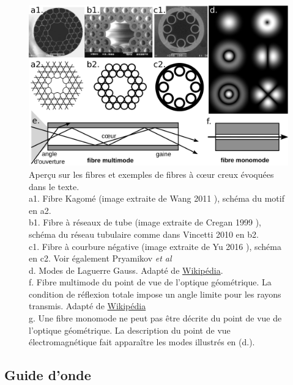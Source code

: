 \begin{figure}
    \centering
    \includegraphics[width=\textwidth]{./files/fibers.svg.png}
    \caption{Aperçu sur les fibres et exemples de fibres à cœur creux évoquées dans le texte.
    \\ a1. Fibre Kagomé (image extraite de Wang 2011 \cite{wang_low_2011}), schéma du motif en a2.
    \\ b1. Fibre à réseaux de tube (image extraite de Cregan 1999 \cite{cregan_single-mode_1999}), schéma du réseau tubulaire comme dans Vincetti 2010 \cite{vincetti_waveguiding_2010} en b2.
    \\ c1. Fibre à courbure négative (image extraite de Yu 2016 \cite{yu_negative_2016}), schéma en c2. Voir également Pryamikov \emph{et al} \cite{pryamikov_demonstration_2011}
    \\ d. Modes de Laguerre Gauss. Adapté de \href{https://en.wikipedia.org/wiki/Transverse_mode}{Wikipédia}.
    \\ f. Fibre multimode du point de vue de l'optique géométrique. La condition de réflexion totale impose un angle limite pour les rayons transmis. Adapté de \href{https://en.wikipedia.org/wiki/Optical_fiber}{Wikipédia}
    \\ g. Une fibre monomode ne peut pas être décrite du point de vue de l'optique géométrique. La description du point de vue électromagnétique fait apparaître les modes illustrés en (d.).
    \label{FIGfiberexamples}}
    \end{figure}

\subsection{Guide d'onde}

